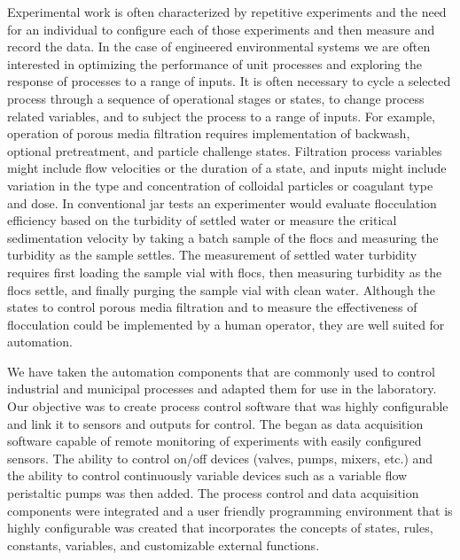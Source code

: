 \documentclass[letterpaper,10pt,english]{sphinxmanual}
\begin{document}
Experimental work is often characterized by repetitive experiments and the need for an individual to configure each of those experiments and then measure and record the data. In the case of engineered environmental systems we are often interested in optimizing the performance of unit processes and exploring the response of processes to a range of inputs. It is often necessary to cycle a selected process through a sequence of operational stages or states, to change process related variables, and to subject the process to a range of inputs. For example, operation of porous media filtration requires implementation of backwash, optional pretreatment, and particle challenge states. Filtration process variables might include flow velocities or the duration of a state, and inputs might include variation in the type and concentration of colloidal particles or coagulant type and dose. In conventional jar tests an experimenter would evaluate flocculation efficiency based on the turbidity of settled water or measure the critical sedimentation velocity by taking a batch sample of the flocs and measuring the turbidity as the sample settles. The measurement of settled water turbidity requires first loading the sample vial with flocs, then measuring turbidity as the flocs settle, and finally purging the sample vial with clean water. Although the states to control porous media filtration and to measure the effectiveness of flocculation could be implemented by a human operator, they are well suited for automation.

We have taken the automation components that are commonly used to control industrial and municipal processes and adapted them for use in the laboratory. Our objective was to create process control software that was highly configurable and link it to sensors and outputs for control. The  began as data acquisition software capable of remote monitoring of experiments with easily configured sensors. The ability to control on/off devices (valves, pumps, mixers, etc.) and the ability to control continuously variable devices such as a variable flow peristaltic pumps was then added. The process control and data acquisition components were integrated and a user friendly programming environment that is highly configurable was created that incorporates the concepts of states, rules, constants, variables, and customizable external functions.
\end{document}
